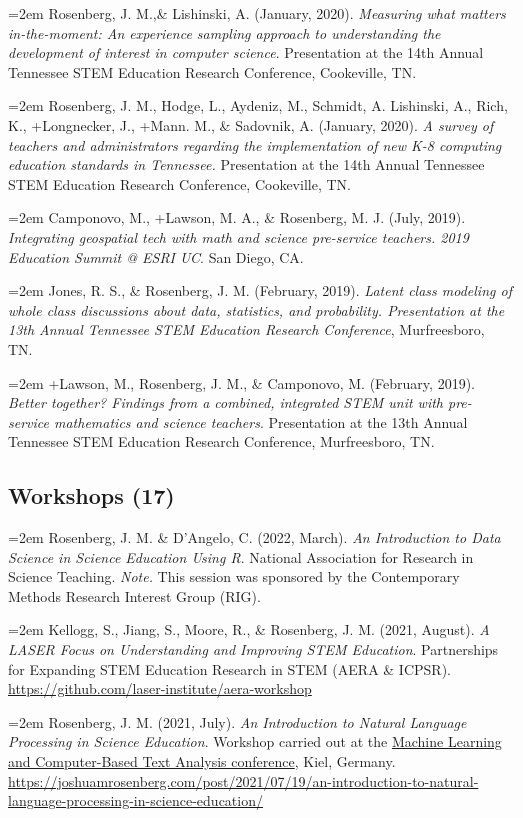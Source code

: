 \documentclass[
  14,
]{article}
\begin{document}
\hangindent=2em Rosenberg, J. M.,\& Lishinski, A. (January, 2020).
\emph{Measuring what matters in-the-moment: An experience sampling
approach to understanding the development of interest in computer
science}. Presentation at the 14th Annual Tennessee STEM Education
Research Conference, Cookeville, TN.

\hangindent=2em Rosenberg, J. M., Hodge, L., Aydeniz, M., Schmidt, A.
Lishinski, A., Rich, K., +Longnecker, J., +Mann. M., \& Sadovnik, A.
(January, 2020). \emph{A survey of teachers and administrators regarding
the implementation of new K-8 computing education standards in
Tennessee.} Presentation at the 14th Annual Tennessee STEM Education
Research Conference, Cookeville, TN.

\hangindent=2em Camponovo, M., +Lawson, M. A., \& Rosenberg, M. J.
(July, 2019). \emph{Integrating geospatial tech with math and science
pre-service teachers. 2019 Education Summit @ ESRI UC}. San Diego, CA.

\hangindent=2em Jones, R. S., \& Rosenberg, J. M. (February, 2019).
\emph{Latent class modeling of whole class discussions about data,
statistics, and probability. Presentation at the 13th Annual Tennessee
STEM Education Research Conference}, Murfreesboro, TN.

\hangindent=2em +Lawson, M., Rosenberg, J. M., \& Camponovo, M.
(February, 2019). \emph{Better together? Findings from a combined,
integrated STEM unit with pre-service mathematics and science teachers}.
Presentation at the 13th Annual Tennessee STEM Education Research
Conference, Murfreesboro, TN.

\hypertarget{workshops-17}{%
\subsection{Workshops (17)}\label{workshops-17}}

\hangindent=2em Rosenberg, J. M. \& D'Angelo, C. (2022, March). \emph{An
Introduction to Data Science in Science Education Using R}. National
Association for Research in Science Teaching. \emph{Note.} This session
was sponsored by the Contemporary Methods Research Interest Group (RIG).

\hangindent=2em Kellogg, S., Jiang, S., Moore, R., \& Rosenberg, J. M.
(2021, August). \emph{A LASER Focus on Understanding and Improving STEM
Education}. Partnerships for Expanding STEM Education Research in STEM
(AERA \& ICPSR). \url{https://github.com/laser-institute/aera-workshop}

\hangindent=2em Rosenberg, J. M. (2021, July). \emph{An Introduction to
Natural Language Processing in Science Education}. Workshop carried out
at the
\href{https://www.ipn.uni-kiel.de/en/the-ipn/news/gdcp-focus-conference-machine-learning-and-computer-based-text-analysis-may-6th-7th-2021-register-now}{Machine
Learning and Computer-Based Text Analysis conference}, Kiel, Germany.
\url{https://joshuamrosenberg.com/post/2021/07/19/an-introduction-to-natural-language-processing-in-science-education/}
\end{document}
